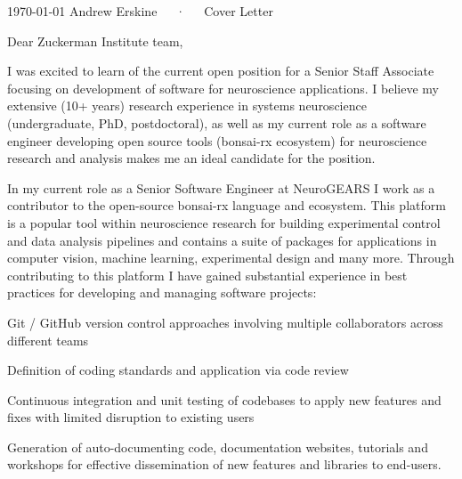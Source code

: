 \documentclass[11pt, letterpaper]{awesome-cv}
\begin{document}
\makecvheader

\makecvfooter
  {\today}
  {Andrew Erskine~~~·~~~Cover Letter}
  {\thepage}



\vspace{5em}

Dear Zuckerman Institute team,

I was excited to learn of the current open position for a Senior Staff Associate focusing on development of software for neuroscience applications. I believe my extensive (10+ years) research experience in systems neuroscience (undergraduate, PhD, postdoctoral), as well as my current role as a software engineer developing open source tools (bonsai-rx ecosystem) for neuroscience research and analysis makes me an ideal candidate for the position.

In my current role as a Senior Software Engineer at NeuroGEARS I work as a contributor to the open-source bonsai-rx language and ecosystem. This platform is a popular tool within neuroscience research for building experimental control and data analysis pipelines and contains a suite of packages for applications in computer vision, machine learning, experimental design and many more. Through contributing to this platform I have gained substantial experience in best practices for developing and managing software projects:
\vspace{1em}
\begin{cvitems}
  \item {Git / GitHub version control approaches involving multiple collaborators across different teams}
  \item {Definition of coding standards and application via code review}
  \item {Continuous integration and unit testing of codebases to apply new features and fixes with limited disruption to existing users}
  \item {Generation of auto-documenting code, documentation websites, tutorials and workshops for effective dissemination of new features and libraries to end-users.}
\end{cvitems}
\vspace{1em}
\end{document}
